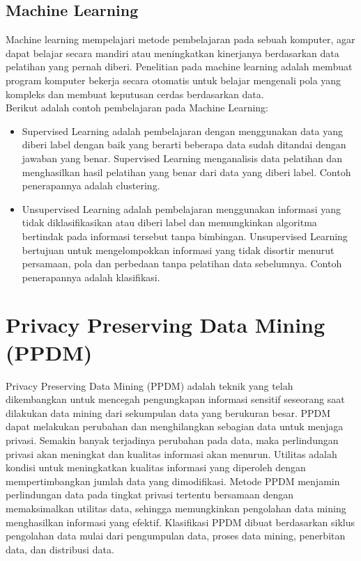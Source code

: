 \subsection{Machine Learning} 
Machine learning mempelajari metode pembelajaran pada sebuah komputer, agar dapat belajar secara mandiri atau meningkatkan kinerjanya berdasarkan data pelatihan yang pernah diberi. Penelitian pada machine learning adalah membuat program komputer bekerja secara otomatis untuk belajar mengenali pola yang kompleks dan membuat keputusan cerdas berdasarkan data. \\

\noindent Berikut adalah contoh pembelajaran pada Machine Learning:

\begin{itemize}

\item
Supervised Learning adalah pembelajaran dengan menggunakan data yang diberi label dengan baik yang berarti beberapa data sudah ditandai dengan jawaban yang benar. Supervised Learning menganalisis data pelatihan dan menghasilkan hasil pelatihan yang benar dari data yang diberi label. Contoh penerapannya adalah clustering.

\item
Unsupervised Learning adalah pembelajaran menggunakan informasi yang tidak diklasifikasikan atau diberi label dan memungkinkan algoritma  bertindak pada informasi tersebut tanpa bimbingan. Unsupervised Learning bertujuan untuk mengelompokkan informasi yang tidak disortir menurut persamaan, pola dan perbedaan tanpa pelatihan data sebelumnya. Contoh penerapannya adalah klasifikasi.

\end{itemize}

\newpage
\section{Privacy Preserving Data Mining (PPDM)} 
Privacy Preserving Data Mining (PPDM) adalah teknik yang telah dikembangkan untuk mencegah pengungkapan informasi sensitif seseorang saat dilakukan data mining dari sekumpulan data yang berukuran besar. PPDM dapat melakukan perubahan dan  menghilangkan sebagian data untuk menjaga privasi. Semakin banyak terjadinya perubahan pada data, maka perlindungan privasi akan meningkat dan kualitas informasi akan menurun.  Utilitas adalah kondisi untuk meningkatkan kualitas informasi yang diperoleh dengan mempertimbangkan jumlah data yang dimodifikasi. Metode PPDM menjamin perlindungan data pada tingkat privasi tertentu bersamaan dengan memaksimalkan utilitas data, sehingga memungkinkan pengolahan data mining menghasilkan informasi yang efektif. Klasifikasi PPDM dibuat berdasarkan siklus pengolahan data mulai dari pengumpulan data, proses data mining, penerbitan data, dan distribusi data.

